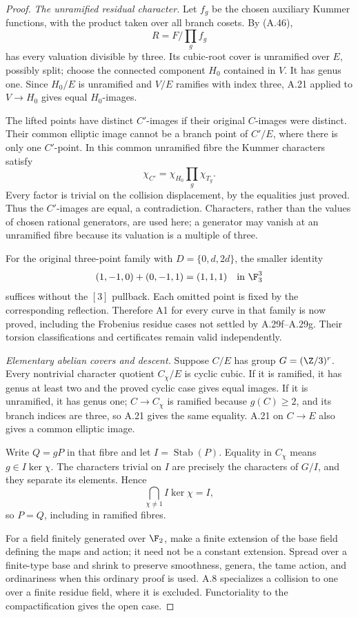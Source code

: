 \begin{proof}
\emph{The unramified residual character.}
Let $f_g$ be the chosen auxiliary Kummer functions, with
the product taken over all branch cosets. By (A.46),
\[
 R=F/\prod_g f_g
\]
has every valuation divisible by three. Its cubic-root
cover is unramified over $E$, possibly split; choose the
connected component $H_0$ contained in $V$. It has genus
one. Since $H_0/E$ is unramified and $V/E$ ramifies with
index three, A.21 applied to $V\to H_0$ gives equal
$H_0$-images.

The lifted points have distinct $C'$-images if their
original $C$-images were distinct. Their common elliptic
image cannot be a branch point of $C'/E$, where there is
only one $C'$-point. In this common unramified fibre the
Kummer characters satisfy
\[
 \chi_{C'}=\chi_{H_0}\prod_g\chi_{T_g}.
\]
Every factor is trivial on the collision displacement,
by the equalities just proved. Thus the $C'$-images are
equal, a contradiction. Characters, rather than the
values of chosen rational generators, are used here;
a generator may vanish at an unramified fibre because
its valuation is a multiple of three.

For the original three-point family with
$D=\{0,d,2d\}$, the smaller identity
\[
 (1,-1,0)+(0,-1,1)=(1,1,1)\quad\text{in }\F_3^3
\]
suffices without the $[3]$ pullback. Each omitted point
is fixed by the corresponding reflection. Therefore
A1 for every curve in that family is now proved,
including the Frobenius residue cases not settled by
A.29f--A.29g. Their torsion classifications and
certificates remain valid independently.

\emph{Elementary abelian covers and descent.}
Suppose $C/E$ has group $G=(\Z/3)^r$. Every nontrivial
character quotient $C_\chi/E$ is cyclic cubic. If it is
ramified, it has genus at least two and the proved
cyclic case gives equal images. If it is unramified,
it has genus one; $C\to C_\chi$ is ramified because
$g(C)\ge2$, and its branch indices are three, so A.21
gives the same equality. A.21 on $C\to E$ also gives a
common elliptic image.

Write $Q=gP$ in that fibre and let $I=\operatorname{Stab}(P)$.
Equality in $C_\chi$ means $g\in I\ker\chi$.
The characters trivial on $I$ are precisely the
characters of $G/I$, and they separate its elements.
Hence
\[
 \bigcap_{\chi\ne1}I\ker\chi=I,
\]
so $P=Q$, including in ramified fibres.

For a field finitely generated over $\F_2$, make a finite
extension of the base field defining the maps and action;
it need not be a constant extension. Spread over a
finite-type base and shrink to preserve smoothness,
genera, the tame action, and ordinariness when this
ordinary proof is used. A.8 specializes a collision
to one over a finite residue field, where it is excluded.
Functoriality to the compactification gives the open case.


\end{proof}
